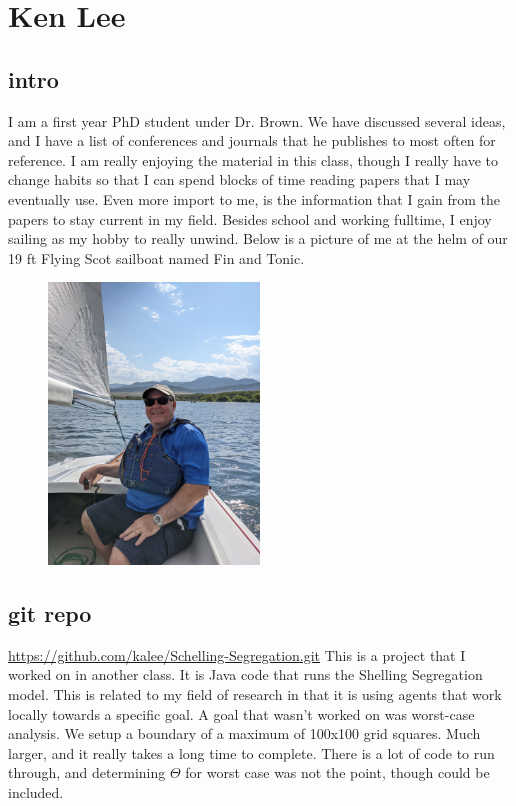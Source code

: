 \section{Ken Lee}
\subsection{intro}
I am a first year PhD student under Dr. Brown.  
We have discussed several ideas, and I have a list of conferences and journals that he publishes to most often for reference.
I am really enjoying the material in this class, though I really have to change habits so that I can spend blocks of time reading papers that I may eventually use.  
Even more import to me, is the information that I gain from the papers to stay current in my field.
Besides school and working fulltime, I enjoy sailing as my hobby to really unwind.  
Below is a picture of me at the helm of our 19 ft Flying Scot sailboat named Fin and Tonic.
\begin{figure}[!htb]
\centering
\includegraphics[width=0.5\textwidth]{sailing_flyingscot.jpg}
\end{figure}

\subsection{git repo}
\url{https://github.com/kalee/Schelling-Segregation.git} This is a project that I worked on in another class.  
It is Java code that runs the Shelling Segregation model.  
This is related to my field of research in that it is using agents that work locally towards a specific goal.  
A goal that wasn't worked on was worst-case analysis.  
We setup a boundary of a maximum of 100x100 grid squares.  
Much larger, and it really takes a long time to complete.  
There is a lot of code to run
through, and determining $\Theta$ for worst case was not the point, though could be included.

